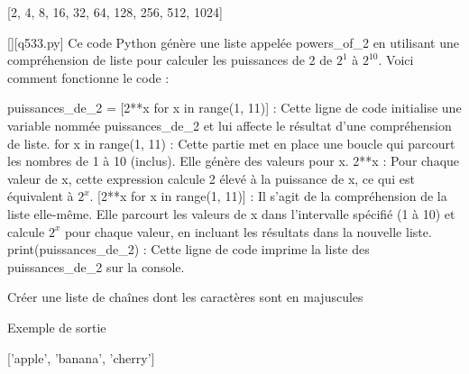 [2, 4, 8, 16, 32, 64, 128, 256, 512, 1024]
        \par
        \begin{solution}
            \renewcommand{\nomfichier}{q533.py}
            \pythonfile{\chemincode \nomfichier}[][\nomfichier]
            Ce code Python génère une liste appelée powers\_of\_2 en utilisant une compréhension de liste pour calculer les puissances de 2 de $2^1$ à $2^10$. Voici comment fonctionne le code :

    puissances\_de\_2 = [2**x for x in range(1, 11)] : Cette ligne de code initialise une variable nommée puissances\_de\_2 et lui affecte le résultat d'une compréhension de liste.
        for x in range(1, 11) : Cette partie met en place une boucle qui parcourt les nombres de 1 à 10 (inclus). Elle génère des valeurs pour x.
        2**x : Pour chaque valeur de x, cette expression calcule 2 élevé à la puissance de x, ce qui est équivalent à $2^x$.
        [2**x for x in range(1, 11)] : Il s'agit de la compréhension de la liste elle-même. Elle parcourt les valeurs de x dans l'intervalle spécifié (1 à 10) et calcule $2^x$ pour chaque valeur, en incluant les résultats dans la nouvelle liste.
    print(puissances\_de\_2) : Cette ligne de code imprime la liste des puissances\_de\_2 sur la console.
        \end{solution}
        

        \question
        Créer une liste de chaînes dont les caractères sont en majuscules

Exemple de sortie

['apple', 'banana', 'cherry']

